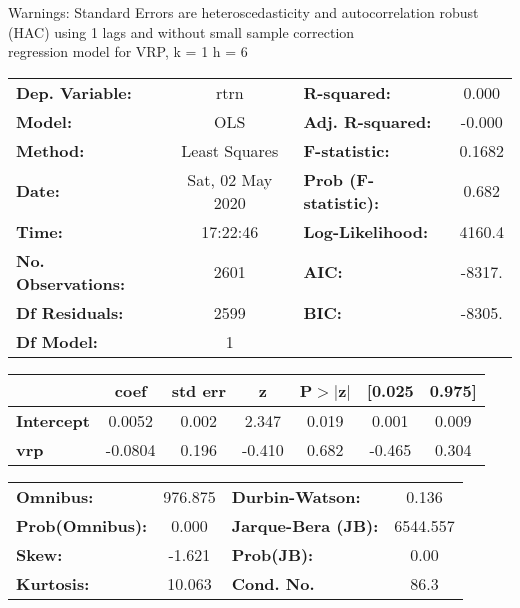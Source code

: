 Warnings: \newline
 [1] Standard Errors are heteroscedasticity and autocorrelation robust (HAC) using 1 lags and without small sample correction\\ 

regression model for VRP, k = 1 h = 6\begin{center}
\begin{tabular}{lclc}
\toprule
\textbf{Dep. Variable:}    &       rtrn       & \textbf{  R-squared:         } &     0.000   \\
\textbf{Model:}            &       OLS        & \textbf{  Adj. R-squared:    } &    -0.000   \\
\textbf{Method:}           &  Least Squares   & \textbf{  F-statistic:       } &    0.1682   \\
\textbf{Date:}             & Sat, 02 May 2020 & \textbf{  Prob (F-statistic):} &    0.682    \\
\textbf{Time:}             &     17:22:46     & \textbf{  Log-Likelihood:    } &    4160.4   \\
\textbf{No. Observations:} &        2601      & \textbf{  AIC:               } &    -8317.   \\
\textbf{Df Residuals:}     &        2599      & \textbf{  BIC:               } &    -8305.   \\
\textbf{Df Model:}         &           1      & \textbf{                     } &             \\
\bottomrule
\end{tabular}
\begin{tabular}{lcccccc}
                   & \textbf{coef} & \textbf{std err} & \textbf{z} & \textbf{P$> |$z$|$} & \textbf{[0.025} & \textbf{0.975]}  \\
\midrule
\textbf{Intercept} &       0.0052  &        0.002     &     2.347  &         0.019        &        0.001    &        0.009     \\
\textbf{vrp}       &      -0.0804  &        0.196     &    -0.410  &         0.682        &       -0.465    &        0.304     \\
\bottomrule
\end{tabular}
\begin{tabular}{lclc}
\textbf{Omnibus:}       & 976.875 & \textbf{  Durbin-Watson:     } &    0.136  \\
\textbf{Prob(Omnibus):} &   0.000 & \textbf{  Jarque-Bera (JB):  } & 6544.557  \\
\textbf{Skew:}          &  -1.621 & \textbf{  Prob(JB):          } &     0.00  \\
\textbf{Kurtosis:}      &  10.063 & \textbf{  Cond. No.          } &     86.3  \\
\bottomrule
\end{tabular}
\end{center}

